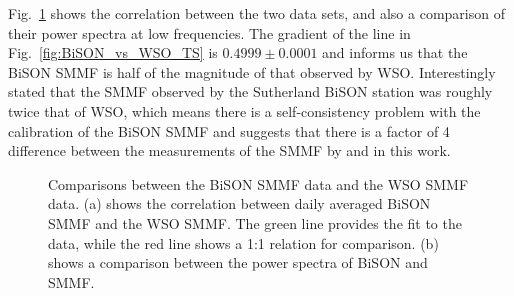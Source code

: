 Fig.~\ref{fig:BiSON_vs_WSO} shows the correlation between the two data sets, and also a comparison of their power spectra at low frequencies. The gradient of the line in Fig.~\ref{fig:BiSON_vs_WSO_TS} is $0.4999\pm0.0001$ and informs us that the BiSON SMMF is half of the magnitude of that observed by WSO. Interestingly \citet{chaplin_studies_2003} stated that the SMMF observed by the Sutherland BiSON station was roughly twice that of WSO, which means there is a self-consistency problem with the calibration of the BiSON SMMF and suggests that there is a factor of 4 difference between the measurements of the SMMF by \citet{chaplin_studies_2003} and in this work.

\begin{figure}[ht!]
	\centering
	\qquad
	\caption{Comparisons between the BiSON SMMF data and the WSO SMMF data. (a) shows the correlation between daily averaged BiSON SMMF and the WSO SMMF. The green line provides the fit to the data, while the red line shows a 1:1 relation for comparison. (b) shows a comparison between the power spectra of BiSON and SMMF.} \label{fig:BiSON_vs_WSO}
\end{figure}



